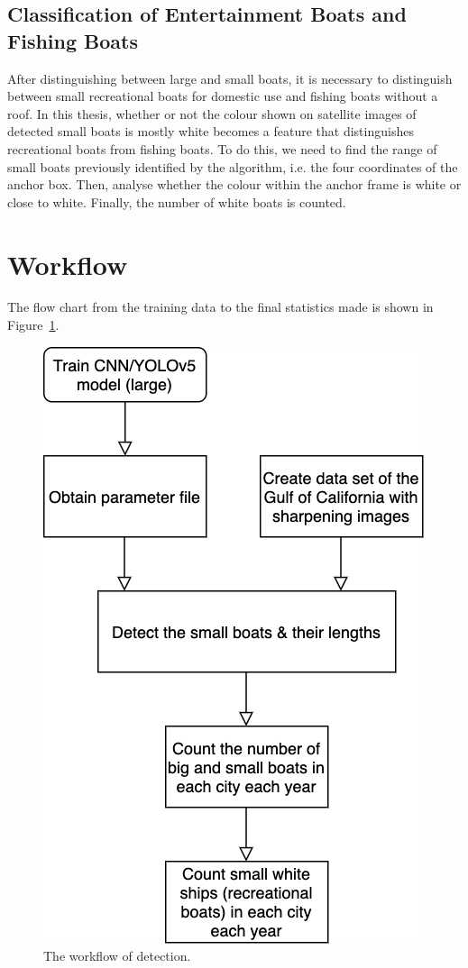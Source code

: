 \subsection{Classification of Entertainment Boats and Fishing Boats}
\label{sec:3.2.5}
After distinguishing between large and small boats, it is necessary to distinguish between small recreational boats for domestic use and fishing boats without a roof. In this thesis, whether or not the colour shown on satellite images of detected small boats is mostly white becomes a feature that distinguishes recreational boats from fishing boats. To do this, we need to find the range of small boats previously identified by the algorithm, i.e. the four coordinates of the anchor box. Then, analyse whether the colour within the anchor frame is white or close to white. Finally, the number of white boats is counted.


\section{Workflow}
The flow chart from the training data to the final statistics made is shown in Figure~\ref{fig:workflow}.
\begin{figure}[h]
    \centering
    \includegraphics[scale=0.6]{img/workflow.png}
    \caption{The workflow of detection.}
    \label{fig:workflow}
\end{figure}